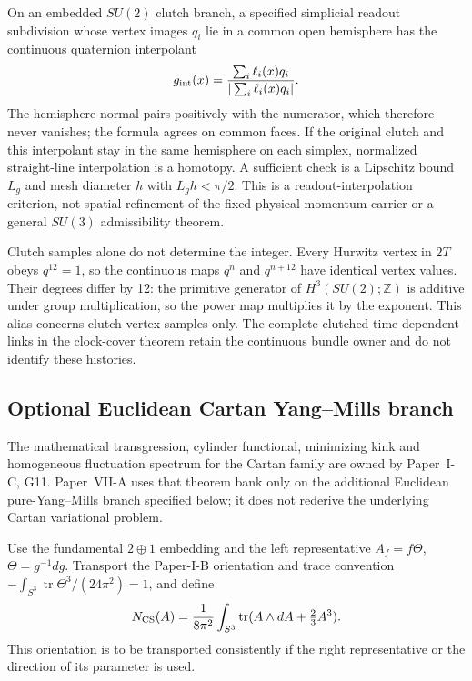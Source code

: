 \documentclass[12pt,a4paper]{article}
\begin{document}
On an embedded \(SU(2)\) clutch branch, a specified simplicial readout
subdivision whose vertex images \(q_i\) lie in a common open hemisphere
has the continuous quaternion interpolant
\[
 g_{\rm int}(x)=\frac{\sum_i\ell_i(x)q_i}{|\sum_i\ell_i(x)q_i|}.
\]
The hemisphere normal pairs positively with the numerator, which therefore
never vanishes; the formula agrees on common faces.  If the original clutch
and this interpolant stay in the same hemisphere on each simplex, normalized
straight-line interpolation is a homotopy.  A sufficient check is a
Lipschitz bound \(L_g\) and mesh diameter \(h\) with \(L_gh<\pi/2\).
This is a readout-interpolation criterion, not spatial refinement of the
fixed physical momentum carrier or a general \(SU(3)\) admissibility theorem.

Clutch samples alone do not determine the integer.  Every Hurwitz vertex in
\(2T\) obeys \(q^{12}=1\), so the continuous maps \(q^n\) and
\(q^{n+12}\) have identical vertex values.  Their degrees differ by 12:
the primitive generator of \(H^3(SU(2);\mathbb Z)\) is additive under
group multiplication, so the power map multiplies it by the exponent.
This alias concerns clutch-vertex samples only.  The complete clutched
time-dependent links in the clock-cover theorem retain the continuous
bundle owner and do not identify these histories.


\subsection{Optional Euclidean Cartan Yang--Mills branch}
\label{p10:app:v199-cartan-yang-mills}
The mathematical transgression, cylinder functional, minimizing kink and
homogeneous fluctuation spectrum for the Cartan family are owned by
Paper~I-C, G11.  Paper~VII-A uses that theorem bank only on the additional
Euclidean pure-Yang--Mills branch specified below; it does not rederive the
underlying Cartan variational problem.

Use the fundamental \(2\oplus1\) embedding and the left representative
\(A_f=f\Theta\), \(\Theta=g^{-1}dg\).  Transport the Paper-I-B orientation
and trace convention
\(-\int_{S^3}\operatorname{tr}\Theta^3/(24\pi^2)=1\), and define
\[
 N_{\rm CS}(A)=\frac1{8\pi^2}\int_{S^3}
 \operatorname{tr}(A\wedge dA+\tfrac23A^3).
\]
This orientation is to be transported consistently if the right
representative or the direction of its parameter is used.
\end{document}

